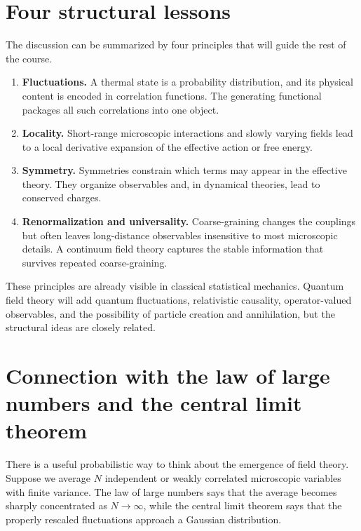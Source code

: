 \documentclass[11pt]{article}
\begin{document}
\section{Four structural lessons}

The discussion can be summarized by four principles that will guide the rest of the course.

\begin{enumerate}
  \item \textbf{Fluctuations.}  A thermal state is a probability distribution, and its physical content is encoded in correlation functions.  The generating functional packages all such correlations into one object.

  \item \textbf{Locality.}  Short-range microscopic interactions and slowly varying fields lead to a local derivative expansion of the effective action or free energy.

  \item \textbf{Symmetry.}  Symmetries constrain which terms may appear in the effective theory.  They organize observables and, in dynamical theories, lead to conserved charges.

  \item \textbf{Renormalization and universality.}  Coarse-graining changes the couplings but often leaves long-distance observables insensitive to most microscopic details.  A continuum field theory captures the stable information that survives repeated coarse-graining.
\end{enumerate}

These principles are already visible in classical statistical mechanics.  Quantum field theory will add quantum fluctuations, relativistic causality, operator-valued observables, and the possibility of particle creation and annihilation, but the structural ideas are closely related.

\section{Connection with the law of large numbers and the central limit theorem}

There is a useful probabilistic way to think about the emergence of field theory.  Suppose we average $N$ independent or weakly correlated microscopic variables with finite variance.  The law of large numbers says that the average becomes sharply concentrated as $N\to\infty$, while the central limit theorem says that the properly rescaled fluctuations approach a Gaussian distribution.
\end{document}
